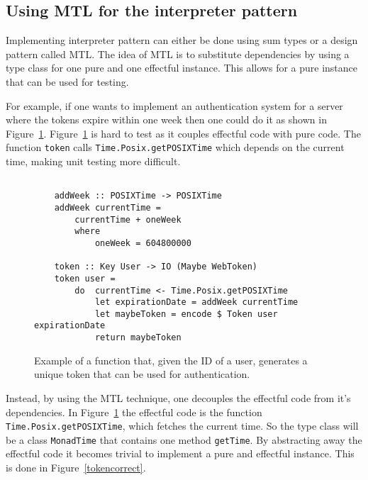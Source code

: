\subsection{Using MTL for the interpreter pattern}\label{mtl}

Implementing interpreter pattern can either be done using sum types or a design
pattern called MTL. The idea of MTL is to substitute dependencies by using a
type class for one pure and one effectful instance. This allows for a pure
instance that can be used for testing.

For example, if one wants to implement an authentication system for a server
where the tokens expire within one week then one could do it as shown in
Figure~\ref{tokennaive}. Figure~\ref{tokennaive} is hard to test as it couples
effectful code with pure code. The function \texttt{token} calls
\texttt{Time.Posix.getPOSIXTime} which depends on the current time,
making unit testing more difficult.

\begin{figure}[H]
    \begin{lstlisting}

    addWeek :: POSIXTime -> POSIXTime
    addWeek currentTime =
        currentTime + oneWeek
        where
            oneWeek = 604800000

    token :: Key User -> IO (Maybe WebToken)
    token user =
        do  currentTime <- Time.Posix.getPOSIXTime
            let expirationDate = addWeek currentTime
            let maybeToken = encode $ Token user expirationDate
            return maybeToken
    \end{lstlisting}
    \caption{Example of a function that, given the ID of a user, generates a
    unique token that can be used for authentication.}
    \label{tokennaive}
\end{figure}

Instead, by using the MTL technique, one decouples the effectful code from it's
dependencies. In Figure~\ref{tokennaive} the effectful code is the function
\texttt{Time.Posix.getPOSIXTime}, which fetches the current time. So the type
class will be a class \texttt{MonadTime} that contains one method
\texttt{getTime}. By abstracting away the effectful code it becomes trivial to
implement a pure and effectful instance. This is done in
Figure~\ref{tokencorrect}. 

